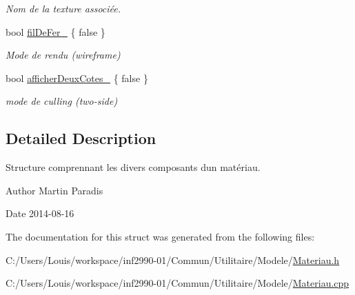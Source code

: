 \begin{DoxyCompactItemize}
\begin{DoxyCompactList}\small\item\em Nom de la texture associée. \end{DoxyCompactList}\item 
\hypertarget{structmodele_1_1_materiau_a55e6d3d19eb038d86097568353cbad06}{}bool \hyperlink{structmodele_1_1_materiau_a55e6d3d19eb038d86097568353cbad06}{fil\+De\+Fer\+\_\+} \{ false \}\label{structmodele_1_1_materiau_a55e6d3d19eb038d86097568353cbad06}

\begin{DoxyCompactList}\small\item\em Mode de rendu (wireframe) \end{DoxyCompactList}\item 
\hypertarget{structmodele_1_1_materiau_aab5dc5905e9d580acdeba0bcc7853108}{}bool \hyperlink{structmodele_1_1_materiau_aab5dc5905e9d580acdeba0bcc7853108}{afficher\+Deux\+Cotes\+\_\+} \{ false \}\label{structmodele_1_1_materiau_aab5dc5905e9d580acdeba0bcc7853108}

\begin{DoxyCompactList}\small\item\em mode de culling (two-\/side) \end{DoxyCompactList}\end{DoxyCompactItemize}


\subsection{Detailed Description}
Structure comprennant les divers composants d\textquotesingle{}un matériau. 

\begin{DoxyAuthor}{Author}
Martin Paradis 
\end{DoxyAuthor}
\begin{DoxyDate}{Date}
2014-\/08-\/16 
\end{DoxyDate}


The documentation for this struct was generated from the following files\+:\begin{DoxyCompactItemize}
\item 
C\+:/\+Users/\+Louis/workspace/inf2990-\/01/\+Commun/\+Utilitaire/\+Modele/\hyperlink{_materiau_8h}{Materiau.\+h}\item 
C\+:/\+Users/\+Louis/workspace/inf2990-\/01/\+Commun/\+Utilitaire/\+Modele/\hyperlink{_materiau_8cpp}{Materiau.\+cpp}\end{DoxyCompactItemize}

